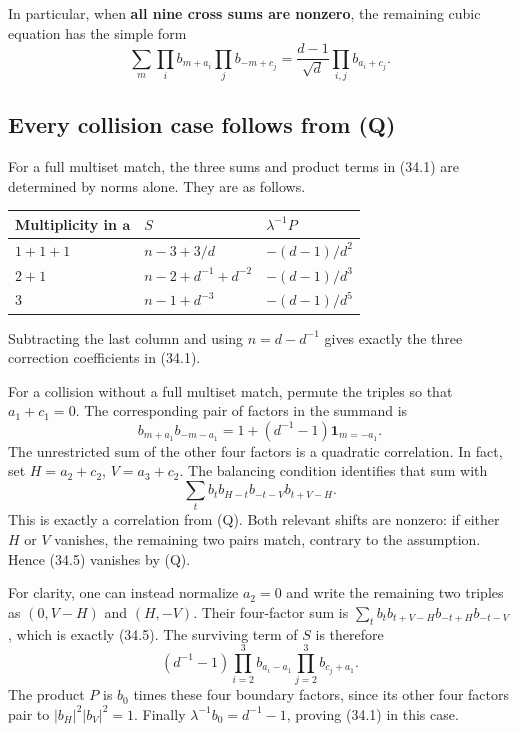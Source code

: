 \documentclass[11pt,reqno]{amsart}
\theoremstyle{plain}
\begin{document}
In particular, when \textbf{all nine cross sums are nonzero}, the remaining
cubic equation has the simple form
\begin{equation*}
 \sum_m\prod_i b_{m+a_i}\prod_j b_{-m+c_j}
 =\frac{d-1}{\sqrt d}\prod_{i,j}b_{a_i+c_j}. \tag{34.4}
\end{equation*}

\subsection{Every collision case follows from (Q)}\label{sec:34.2}

For a full multiset match, the three sums and product terms in (34.1)
are determined by norms alone. They are as follows.

\begin{center}\small
\begin{tabular}{@{}lll@{}}
\toprule
Multiplicity in \(\mathbf a\) & \(S\) & \(\lambda^{-1}P\) \\
\midrule
\(1+1+1\) & \(n-3+3/d\) & \(-(d-1)/d^2\) \\
\(2+1\) & \(n-2+d^{-1}+d^{-2}\) & \(-(d-1)/d^3\) \\
\(3\) & \(n-1+d^{-3}\) & \(-(d-1)/d^5\) \\
\bottomrule
\end{tabular}
\end{center}

Subtracting the last column and using \(n=d-d^{-1}\) gives exactly
the three correction coefficients in (34.1).

For a collision without a full multiset match, permute the triples
so that \(a_1+c_1=0\). The corresponding pair of factors in the
summand is
\[
 b_{m+a_1}b_{-m-a_1}
 =1+(d^{-1}-1)\mathbf1_{m=-a_1}.
\]
The unrestricted sum of the other four factors is a quadratic
correlation. In fact, set \(H=a_2+c_2\), \(V=a_3+c_2\).
The balancing condition identifies that sum with
\begin{equation*}
 \sum_t b_t b_{H-t}b_{-t-V}b_{t+V-H}. \tag{34.5}
\end{equation*}
This is exactly a correlation from (Q). Both relevant shifts are nonzero: if either
\(H\) or \(V\) vanishes, the remaining two pairs match, contrary
to the assumption. Hence (34.5) vanishes by (Q).

For clarity, one can instead normalize \(a_2=0\) and write the
remaining two triples as \((0,V-H)\) and \((H,-V)\).
Their four-factor sum is
\(\sum_t b_t b_{t+V-H}b_{-t+H}b_{-t-V}\),
which is exactly (34.5).
The surviving term of \(S\) is therefore
\[
 (d^{-1}-1)
 \prod_{i=2}^3b_{a_i-a_1}\prod_{j=2}^3b_{c_j+a_1}.
\]
The product \(P\) is \(b_0\) times these four boundary factors,
since its other four factors pair to
\(|b_H|^2|b_V|^2=1\). Finally
\(\lambda^{-1}b_0=d^{-1}-1\), proving (34.1) in this case.
\end{document}
